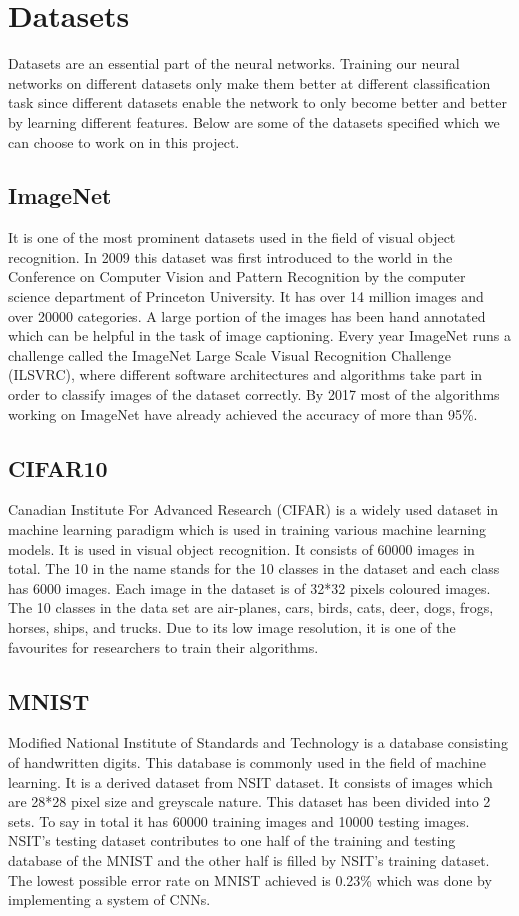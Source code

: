 \documentclass[titlepage]{report}
\begin{document}
\section{Datasets}
Datasets are an essential part of the neural networks. Training our neural networks on different datasets only make them better at different classification task since different datasets enable the network to only become better and better by learning different features. Below are some of the datasets specified which we can choose to work on in this project.

\subsection{ImageNet}
It is one of the most prominent datasets used in the field of visual object recognition. In 2009 this dataset was first introduced to the world in the Conference on Computer Vision and Pattern Recognition by the computer science department of  Princeton University. It has over 14 million images and over 20000 categories. A large portion of the images has been hand annotated which can be helpful in the task of image captioning. Every year ImageNet runs a challenge called the ImageNet Large Scale Visual Recognition Challenge (ILSVRC), where different software architectures and algorithms take part in order to classify images of the dataset correctly. By 2017 most of the algorithms working on ImageNet have already achieved the accuracy of more than 95\%.

\subsection{CIFAR10}
Canadian Institute For Advanced Research (CIFAR) is a widely used dataset in machine learning paradigm which is used in training various machine learning models. It is used in visual object recognition. It consists of 60000 images in total. The 10 in the name stands for the 10 classes in the dataset and each class has 6000 images. Each image in the dataset is of 32*32 pixels coloured images. The 10 classes in the data set are air-planes, cars, birds, cats, deer, dogs, frogs, horses, ships, and trucks.  Due to its low image resolution, it is one of the favourites for researchers to train their algorithms. 

\subsection{MNIST}
Modified National Institute of Standards and Technology is a database consisting of handwritten digits. This database is commonly used in the field of machine learning. It is a derived dataset from NSIT dataset. It consists of images which are 28*28 pixel size and greyscale nature. This dataset has been divided into 2 sets. To say in total it has 60000 training images and 10000 testing images. NSIT's testing dataset contributes to one half of the training and testing database of the MNIST and the other half is filled by NSIT's training dataset. The lowest possible error rate on MNIST achieved is 0.23\%
which was done by implementing a system of CNNs.
\end{document}
